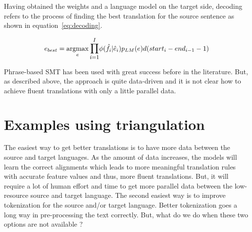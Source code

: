 Having obtained the weights and a language model on the target side, decoding refers to the process of finding the best translation for the source sentence as shown in equation~\eqref{eq:decoding}. 

\begin{equation} \label{eq:decoding}
	e_{best} = \argmax_{e} \mathlarger{\prod\limits_{i=1}^I} \phi(\hat{f}_{i} | \hat{e}_{i})p_{LM}(e)d(start_{i} - end_{i-1}-1)
\end{equation}


Phrase-based SMT has been used with great success before in the literature. But, as described above, the approach is quite data-driven and it is not clear how to achieve fluent translations with only a little parallel data.  

\section{Examples using triangulation}

The easiest way to get better translations is to have more data between the source and target languages. As the amount of data increases, the models will learn the correct alignments which leads to more meaningful translation rules with accurate feature values and thus, more fluent translations. But, it will require a lot of human effort and time to get more parallel data between the low-resource source and target language. The second easiest way is to improve tokenization for the source and/or target language. Better tokenization goes a long way in pre-processing the text correctly. But, what do we do when these two options are not available ? 

\newcommand{\mawuexample}[1]{\emph{$y\grave{a}ng\acute{a}l\acute{a}\grave{a}$ w$\acute{\varepsilon}\acute{\varepsilon}$ $\grave{a}$ $\grave{a}$ l$\acute{a}$kw$\acute{e}$ k$\acute{o}\acute{o}$ b$\acute{\varepsilon}$ m$\grave{a}$ .}}

\newcommand{\anothermawu}[1]{\emph{\textipa{\!d}y$\grave{e}$n\textipa{\textltailn}$\acute{o}$ l$\grave{a}$ $\acute{i}$ kw$\acute{ɔ}$l$\grave{ɔ}$ $\acute{à}n$ d$\grave{a}$$\grave{a}$ l$\grave{u}$ m$\grave{a}$ }}

